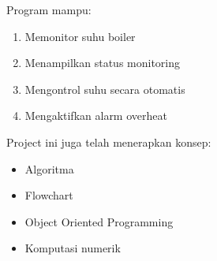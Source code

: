 \documentclass[a4paper,12pt]{article}
\begin{document}
Program mampu:
\begin{enumerate}
    \item Memonitor suhu boiler
    \item Menampilkan status monitoring
    \item Mengontrol suhu secara otomatis
    \item Mengaktifkan alarm overheat
\end{enumerate}


Project ini juga telah menerapkan konsep:
\begin{itemize}
    \item Algoritma
    \item Flowchart
    \item Object Oriented Programming
    \item Komputasi numerik
\end{itemize}
\end{document}
